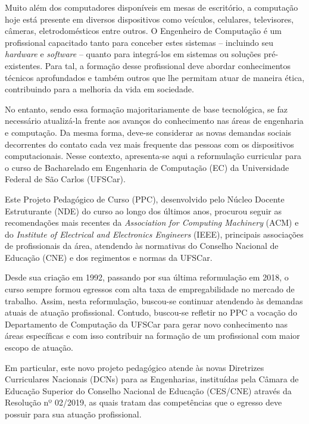 

Muito além dos computadores disponíveis em mesas de escritório, a computação hoje está presente em diversos dispositivos como veículos, celulares, televisores, câmeras, eletrodomésticos entre outros. O Engenheiro de Computação é um profissional capacitado tanto para conceber estes sistemas -- incluindo seu \textit{hardware} e \textit{software} -- quanto para integrá-los em sistemas ou soluções pré-existentes. Para tal, a formação desse profissional deve abordar conhecimentos técnicos aprofundados e também outros que lhe permitam atuar de maneira ética, contribuindo para a melhoria da vida em sociedade.

No entanto, sendo essa formação majoritariamente de base tecnológica, se faz necessário atualizá-la frente aos avanços do conhecimento nas áreas de engenharia e computação. Da mesma forma, deve-se considerar as novas demandas sociais decorrentes do contato cada vez mais frequente das pessoas com os dispositivos computacionais. Nesse contexto, apresenta-se aqui a reformulação curricular para o curso de Bacharelado em Engenharia de Computação (EC) da Universidade Federal de São Carlos (UFSCar).

Este Projeto Pedagógico de Curso (PPC), desenvolvido pelo Núcleo Docente Estruturante (NDE) do curso ao longo dos últimos anos, procurou seguir as recomendações mais recentes da \textit{Association for Computing Machinery} (ACM) e do \textit{Institute of Electrical and Electronics Engineers} (IEEE), principais associações de profissionais da área, atendendo às normativas do Conselho Nacional de Educação (CNE) e dos regimentos e normas da UFSCar.

Desde sua criação em 1992, passando por sua última reformulação em 2018, o curso sempre formou egressos com alta taxa de empregabilidade no mercado de trabalho. Assim, nesta reformulação, buscou-se continuar atendendo às demandas atuais de atuação profissional. Contudo, buscou-se refletir no PPC a vocação do Departamento de Computação da UFSCar para gerar novo conhecimento nas áreas específicas e com isso contribuir na formação de um profissional com maior escopo de atuação.

Em particular, este novo projeto pedagógico atende às novas Diretrizes Curriculares Nacionais (DCNs) para as Engenharias, instituídas pela Câmara de Educação Superior do Conselho Nacional de Educação (CES/CNE) através da Resolução nº 02/2019, as quais tratam das competências que o egresso deve possuir para sua atuação profissional.

